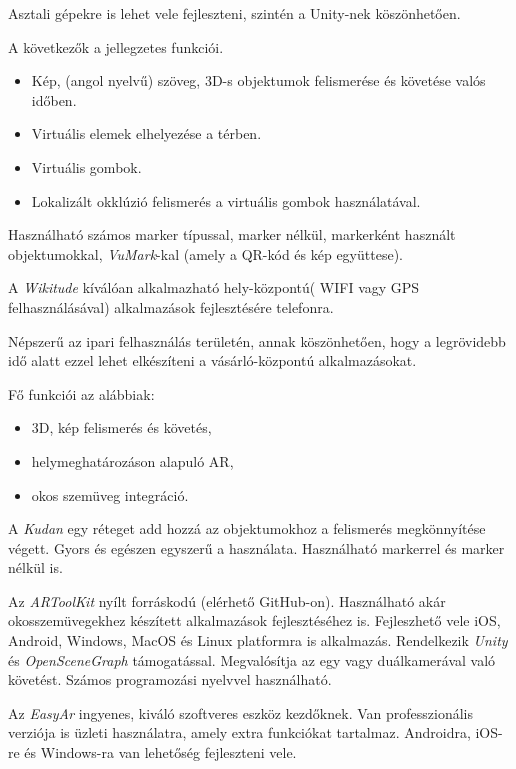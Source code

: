 Asztali gépekre is lehet vele fejleszteni, szintén a Unity-nek köszönhetően. 
  
A következők a jellegzetes funkciói.
\begin{itemize}
\item  Kép, (angol nyelvű) szöveg, 3D-s objektumok felismerése és követése valós időben.
\item  Virtuális elemek elhelyezése a térben.  
\item  Virtuális gombok.
\item  Lokalizált okklúzió felismerés a virtuális gombok használatával.
\end{itemize}
Használható számos marker típussal, marker nélkül, markerként használt objektumokkal, \textit{VuMark}-kal (amely a QR-kód és kép együttese).


A \textit{Wikitude} kíválóan alkalmazható hely-központú( WIFI vagy GPS felhasználásával) alkalmazások fejlesztésére telefonra. 

Népszerű az ipari felhasználás területén, annak köszönhetően, hogy a legrövidebb idő alatt ezzel lehet elkészíteni a vásárló-központú alkalmazásokat. 

Fő funkciói az alábbiak:
\begin{itemize}
\item 3D, kép felismerés és követés,
\item helymeghatározáson alapuló AR,
\item okos szemüveg integráció.
\end{itemize}


A \textit{Kudan} egy réteget add hozzá az objektumokhoz a felismerés megkönnyítése végett. Gyors és egészen egyszerű a használata. 
Használható markerrel és marker nélkül is.


Az \textit{ARToolKit} nyílt forráskodú (elérhető GitHub-on). Használható akár okosszemüvegekhez készített alkalmazások fejlesztéséhez is. Fejleszhető vele iOS, Android, Windows, MacOS és Linux platformra is alkalmazás. 
Rendelkezik \textit{Unity} és \textit{OpenSceneGraph} támogatással.
Megvalósítja az egy vagy duálkamerával való követést. Számos programozási nyelvvel használható.


Az \textit{EasyAr} ingyenes, kiváló szoftveres eszköz kezdőknek. Van professzionális verziója is üzleti használatra, amely extra funkciókat tartalmaz. Androidra, iOS-re és Windows-ra van lehetőség fejleszteni vele.

